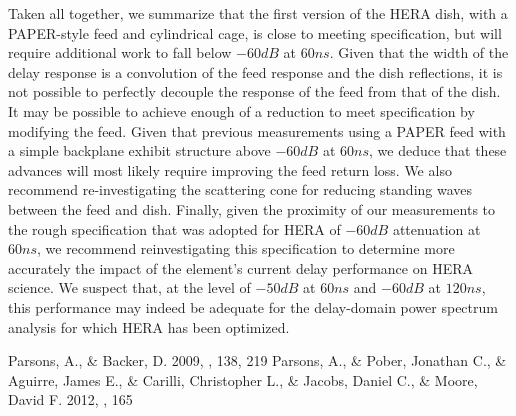 \documentclass[12pt,preprint]{aastex}
\begin{document}
Taken all together, we summarize that the first version of the HERA dish, with a PAPER-style feed and cylindrical cage, is close to meeting
specification, but will require additional work to fall below $-60dB$ at $60ns$.  Given that the width of the delay response is a convolution
of the feed response and the dish reflections, it is not possible to perfectly decouple the response of the feed from that of the dish.
It may be possible to achieve enough of a reduction to meet specification by modifying the feed.
Given that previous measurements using a PAPER feed with a simple backplane exhibit structure above $-60dB$ at $60ns$,
we deduce that these advances will most likely require improving the feed return loss.  We also recommend re-investigating the scattering
cone for reducing standing waves between the feed and dish.  Finally, given the proximity of our measurements to the rough 
specification that was adopted for 
HERA of $-60dB$ attenuation at $60ns$, we recommend reinvestigating this specification to determine more accurately the impact of 
the element's current delay performance on HERA science.  We suspect that, at the level of $-50dB$ at $60ns$ and $-60dB$ at $120ns$, this
performance may indeed be adequate for the delay-domain power spectrum analysis for which HERA has been optimized.

%
%
\begin{thebibliography}{}

Parsons, A., \& Backer, D. 2009, \apj, 138, 219
Parsons, A., \& Pober, Jonathan C., \& Aguirre, James E., \& Carilli, Christopher L., \& Jacobs, Daniel C., \& Moore, David F. 2012, , 165
\end{thebibliography}{}
\end{document}
